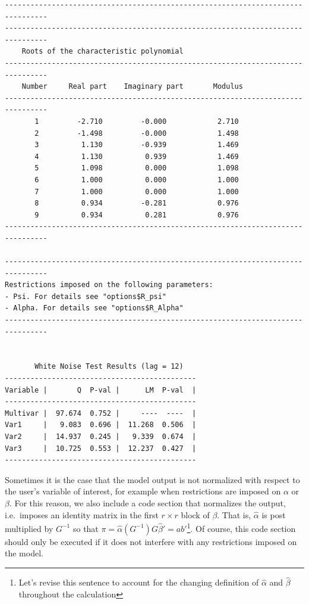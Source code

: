 \documentclass[article]{jss}
\begin{document}
\begin{verbatim}
--------------------------------------------------------------------------------
--------------------------------------------------------------------------------
    Roots of the characteristic polynomial                                                           
--------------------------------------------------------------------------------
    Number     Real part    Imaginary part       Modulus                                             
--------------------------------------------------------------------------------
       1         -2.710         -0.000            2.710                                        
       2         -1.498         -0.000            1.498                                        
       3          1.130         -0.939            1.469                                        
       4          1.130          0.939            1.469                                        
       5          1.098          0.000            1.098                                        
       6          1.000          0.000            1.000                                        
       7          1.000          0.000            1.000                                        
       8          0.934         -0.281            0.976                                        
       9          0.934          0.281            0.976                                        
--------------------------------------------------------------------------------

--------------------------------------------------------------------------------
Restrictions imposed on the following parameters:
- Psi. For details see "options$R_psi"
- Alpha. For details see "options$R_Alpha"
--------------------------------------------------------------------------------


       White Noise Test Results (lag = 12)
---------------------------------------------
Variable |       Q  P-val |      LM  P-val  |
---------------------------------------------
Multivar |  97.674  0.752 |     ----  ----  |
Var1     |   9.083  0.696 |  11.268  0.506  |
Var2     |  14.937  0.245 |   9.339  0.674  |
Var3     |  10.725  0.553 |  12.237  0.427  |
---------------------------------------------
\end{verbatim}

Sometimes it is the case that the model output is not normalized with respect to the user's variable of interest, for example when restrictions are imposed on $\alpha$ or $\beta$. For this reason, we also include a code section that normalizes the output, i.e.\ imposes an identity matrix in the first $r \times r$ block of $\beta$. 
That is, $\hat{\alpha}$ is post multiplied by $G^{-1}$ so that $\pi= \hat{\alpha}(G^{-1})G\hat{\beta}' = ab'$\footnote{Let's revise this sentence to account for the changing definition of $\hat{\alpha}$ and $\hat{\beta}$ throughout the calculation}.
Of course, this code section should only be executed if it does not interfere with any restrictions imposed on the model.
\end{document}
